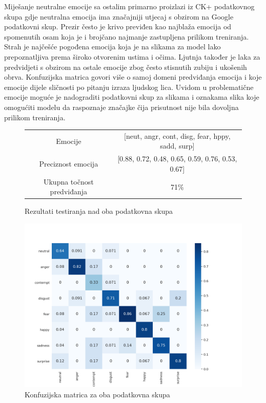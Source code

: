 \documentclass[times, utf8, zavrsni,numeric,pstricks]{fer}
\begin{document}
Miješanje neutralne emocije sa ostalim primarno proizlazi iz CK+ podatkovnog skupa gdje neutralna emocija ima značajniji utjecaj s obzirom na Google podatkovni skup. Prezir  često je krivo previđen kao najblaža emocija od spomenutih osam koja je i brojčano najmanje zastupljena prilikom treniranja. Strah  je najčešće pogođena emocija koja je na slikama za model lako prepoznatljiva prema široko otvorenim ustima i očima. Ljutnja  također je laka za predvidjeti s obzirom na ostale emocije zbog često stisnutih zubiju i ukošenih obrva. Konfuzijska matrica govori više o samoj domeni predviđanja emocija i koje emocije dijele sličnosti po pitanju izraza ljudskog lica. Uvidom u problematične emocije moguće je nadograditi podatkovni skup za slikama i oznakama slika koje omogućiti modelu da raspoznaje značajke čija prisutnost nije bila dovoljna prilikom treniranja. 

\begin{figure}[H]
\centering
		\begin{tabular}
					{|c|c|}\hline
					Emocije & [neut, angr, cont, disg, fear, hppy, sadd, surp]\\
					Preciznost emocija& [0.88, 0.72, 0.48, 0.65, 0.59, 0.76, 0.53, 0.67]\\
					Ukupna točnost predviđanja & 71\%\\
					\hline
		\end{tabular}
		\caption{Rezultati testiranja nad oba podatkovna skupa}
\end{figure}


\begin{figure}[H]
\centering
\includegraphics[width=\linewidth, height=0.3\paperheight, keepaspectratio]{matrix_full.png}
\caption{Konfuzijska matrica za oba podatkovna skupa}
\label{pic:matrix_full}
\end{figure}
\end{document}
